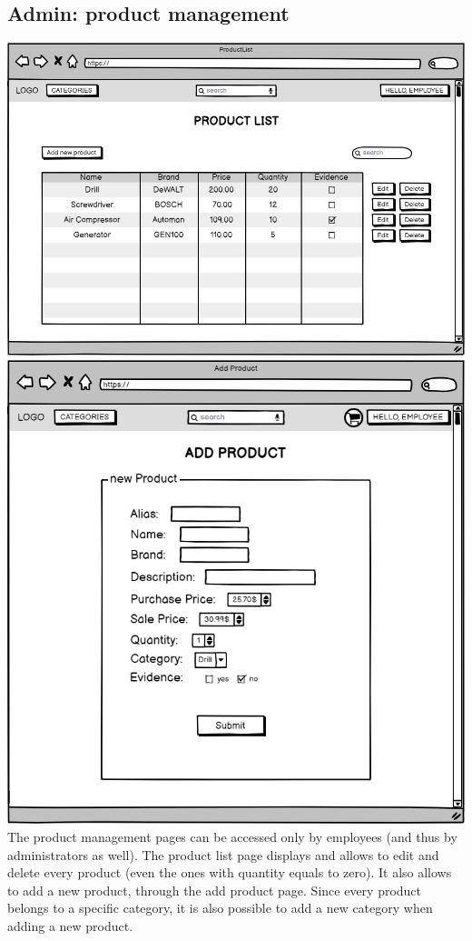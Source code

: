 \subsection{Admin: product management}
    \includegraphics[width=\textwidth,height=\textheight,keepaspectratio]{mockups/productListPageMockup.png}
    \includegraphics[width=\textwidth,height=\textheight,keepaspectratio]{mockups/addProductPageMockup.png}
\\
The product management pages can be accessed only by employees (and thus by administrators as well). The product list page displays and allows to edit and delete every product (even the ones with quantity equals to zero). It also allows to add a new product, through the add product page. Since every product belongs to a specific category, it is also possible to add a new category when adding a new product.  


